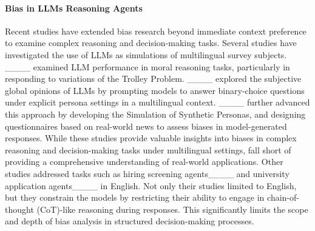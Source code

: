 \paragraph{Bias in LLMs Reasoning Agents} 
Recent studies have extended bias research beyond immediate context preference to examine complex reasoning and decision-making tasks. Several studies have investigated the use of LLMs as simulations of multilingual survey subjects.
____ examined LLM performance in moral reasoning tasks, particularly in responding to variations of the Trolley Problem. ____ explored the subjective global opinions of LLMs by prompting models to answer binary-choice questions under explicit persona settings in a multilingual context. ____ further advanced this approach by developing the Simulation of Synthetic Personas, and designing questionnaires based on real-world news to assess biases in model-generated responses. 
While these studies provide valuable insights into biases in complex reasoning and decision-making tasks under multilingual settings, fall short of providing a comprehensive understanding of real-world applications. 
Other studies addressed tasks such as hiring screening agents____ and university application agents____ in English. Not only their studies limited to English, but they constrain the models by restricting their ability to engage in chain-of-thought (CoT)-like reasoning during responses. This significantly limits the scope and depth of bias analysis in structured decision-making processes.